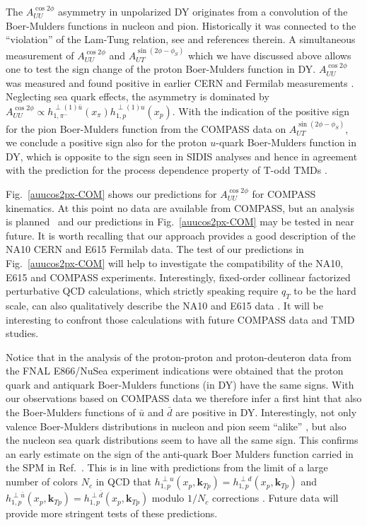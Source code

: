 \documentclass[a4paper]{article}
\def\kTN{{\bm k}_{Tp}}
\begin{document}
The $A_{UU}^{\cos 2\phi}$ asymmetry in unpolarized DY originates 
from a convolution of the Boer-Mulders functions in nucleon and pion.
Historically it was connected to the ``violation'' of the Lam-Tung 
relation, see \cite{Boer:1999mm} and references therein.
A simultaneous measurement of $A_{UU}^{\cos 2\phi}$ and  
$A_{UT}^{\sin(2\phi-\phi_S)}$ which we have discussed above
allows one to test the sign change of the proton Boer-Mulders 
function in DY. $A_{UU}^{\cos 2\phi}$ was measured and found
positive in earlier CERN and Fermilab measurements
\cite{Guanziroli:1987rp,Conway:1989fs}.
Neglecting sea quark effects, the asymmetry is dominated by 
$A_{UU}^{\cos 2\phi}\propto h_{1, \pi^-}^{\perp (1)\bar u }(x_\pi) h_{1,p}^{\perp (1) u} (x_p)$. 
With the indication of the positive sign for the pion Boer-Mulders 
function from the COMPASS data \cite{Aghasyan:2017jop} on  
$A_{UT}^{\sin(2\phi-\phi_S)}$, we conclude a positive sign 
also for the proton $u$-quark Boer-Mulders function in DY, which 
is opposite to the sign seen in SIDIS analyses \cite{Barone:2010gk}
and hence in agreement with the prediction for the process dependence 
property of T-odd TMDs \cite{Collins:2002kn}.

Fig.~\ref{auucos2px-COM} shows our predictions for $A_{UU}^{\cos 2\phi}$ 
for COMPASS kinematics. At this point no data are available from 
COMPASS, but an analysis is planned~\cite{Gautheron:2010wva}
and our predictions in Fig.~\ref{auucos2px-COM} may be tested in near future. 
It is worth recalling that our approach provides a good description 
of the NA10 CERN \cite{Guanziroli:1987rp} and E615 Fermilab
\cite{Conway:1989fs} data. The test of our predictions 
in Fig.~\ref{auucos2px-COM} will help to investigate the compatibility 
of the NA10, E615 and COMPASS experiments.  
Interestingly, fixed-order collinear factorized perturbative 
QCD calculations, which strictly speaking require $q_T$ to be 
the hard scale, can also qualitatively describe 
the NA10 and E615 data \cite{Lambertsen:2016wgj,Chang:2018pvk}. 
It will be interesting to confront those calculations with future 
COMPASS data and TMD studies.

Notice that in the analysis \cite{Barone:2010gk}
of the proton-proton and proton-deuteron data from the FNAL 
E866/NuSea experiment \cite{Zhu:2006gx,Zhu:2008sj} indications
were obtained that the proton quark and antiquark Boer-Mulders 
functions (in DY) have the same signs.
 With our observations 
based on COMPASS data we therefore infer a first hint that 
also the Boer-Mulders functions of $\bar{u}$ and $\bar{d}$ 
are positive in DY. Interestingly, not only valence 
Boer-Mulders distributions in nucleon and pion seem ``alike''
\cite{Burkardt:2007xm}, but also the nucleon sea quark
distributions seem to have all the same sign. 
This confirms an early estimate on the sign
of the anti-quark Boer Mulders function carried in the SPM  in Ref.~\cite{Gamberg:2005ip}.
This is in line with
predictions from the limit of a large number of colors $N_c$ in QCD
that $h_{1,p}^{\perp u} (x_p,\kTN) = h_{1,p}^{\perp d} (x_p,\kTN)$ and 
$h_{1,p}^{\perp\bar u} (x_p,\kTN) = h_{1,p}^{\perp\bar d} (x_p,\kTN)$
modulo $1/N_c$ corrections \cite{Pobylitsa:2003ty}. 
Future data will provide more stringent tests of these 
predictions. 
\end{document}
